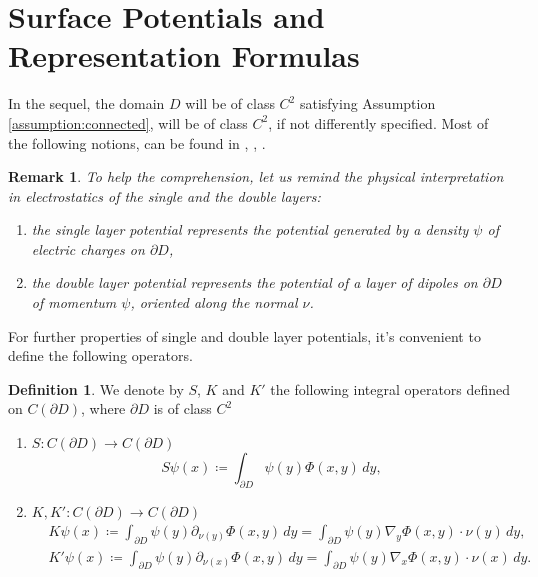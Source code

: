 \documentclass[10pt, a4paper, twoside, openright]{book}
\theoremstyle{definition}
\newtheorem{definition}[subsection]{Definition}
\theoremstyle{plain}
\theoremstyle{plain}
\theoremstyle{plain}
\theoremstyle{plain}
\newtheorem{remark}[subsection]{Remark}
\theoremstyle{plain}
\theoremstyle{plain}
\theoremstyle{plain}
\theoremstyle{plain}
\begin{document}
\section{Surface Potentials and Representation Formulas}
In the sequel, the domain $D$ will be of class $C^2$ satisfying Assumption \ref{assumption:connected}, will be of class $C^2$, if not differently specified.
Most of the following notions, can be found in \cite{kirsch:book}, \cite{colton-kress:book}, \cite{salsa:book}.
\begin{remark}
To help the comprehension, let us remind the physical interpretation in electrostatics of the single and the double layers:
\begin{enumerate}
 \item the single layer potential represents the potential generated by a density $\psi$ of electric charges on $\partial D$,
 \item the double layer potential represents the potential of a layer of dipoles on $\partial D$ of momentum $\psi$, oriented along the normal $\nu$.
\end{enumerate}
\end{remark}
For further properties of single and double layer potentials, it's convenient to define the following operators.
\begin{definition}
 We denote by $S$, $K$  and $K'$ the following integral operators defined on $C(\partial D)$, where $\partial D$ is of class $C^2$
 \begin{enumerate}
  \item  $ S: C(\partial D) \to C(\partial D)$
  \begin{equation}
  S\psi(x)\coloneqq\int_{\partial D}\psi(y) \Phi(x,y)\,dy,\label{def:operator-S}
  \end{equation}
  \item  $ K,K':C(\partial D) \to C(\partial D)$
  \begin{align}
  & K\psi(x)\coloneqq\int_{\partial D} \psi(y) \partial_{\nu(y)} \Phi(x, y) \,dy =\int_{\partial D} \psi(y) \nabla_y\Phi(x, y)\cdot\nu(y) \,dy,\label{def:operator-K}\\
  & K'\psi(x)\coloneqq\int_{\partial D} \psi(y) \partial_{\nu(x)} \Phi(x, y) \,dy =\int_{\partial D} \psi(y) \nabla_x\Phi(x, y)\cdot\nu(x) \,dy.\label{def:operator-K'}
  \end{align}
 \end{enumerate}
\end{definition}
\end{document}
